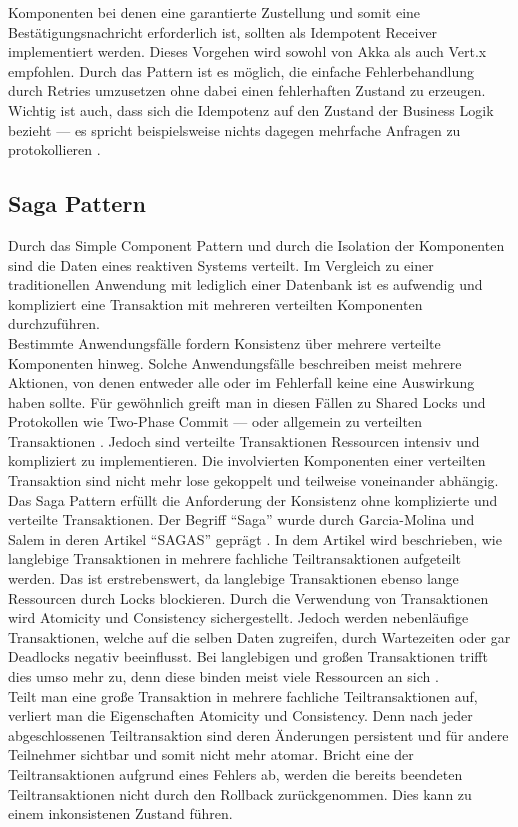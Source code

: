 Komponenten bei denen eine garantierte Zustellung und somit eine Bestätigungsnachricht erforderlich ist, sollten als Idempotent Receiver implementiert werden. Dieses Vorgehen wird sowohl von Akka als auch Vert.x empfohlen. Durch das Pattern ist es möglich, die einfache Fehlerbehandlung durch Retries umzusetzen ohne dabei einen fehlerhaften Zustand zu erzeugen. Wichtig ist auch, dass sich die Idempotenz auf den Zustand der Business Logik bezieht --- es spricht beispielsweise nichts dagegen mehrfache Anfragen zu protokollieren \cite[S.~216]{newman_building_2015}.

\pagebreak

\subsection{Saga Pattern}\label{subsec:saga-pattern}
Durch das Simple Component Pattern und durch die Isolation der Komponenten sind die Daten eines reaktiven Systems verteilt. Im Vergleich zu einer traditionellen Anwendung mit lediglich einer Datenbank ist es aufwendig und kompliziert eine Transaktion mit mehreren verteilten Komponenten durchzuführen.\\
Bestimmte Anwendungsfälle fordern Konsistenz über mehrere verteilte Komponenten hinweg. Solche Anwendungsfälle beschreiben meist mehrere Aktionen, von denen entweder alle oder im Fehlerfall keine eine Auswirkung haben sollte. Für gewöhnlich greift man in diesen Fällen zu Shared Locks und Protokollen wie Two-Phase Commit --- oder allgemein zu verteilten Transaktionen \cite{mccaffrey_goto_2015}. Jedoch sind verteilte Transaktionen Ressourcen intensiv und kompliziert zu implementieren. Die involvierten Komponenten einer verteilten Transaktion sind nicht mehr lose gekoppelt und teilweise voneinander abhängig.\\
Das Saga Pattern erfüllt die Anforderung der Konsistenz ohne komplizierte und verteilte Transaktionen. Der Begriff \enquote{Saga} wurde durch Garcia-Molina und Salem in deren Artikel \enquote{SAGAS} geprägt \cite{garcia-molina_sagas_1987}. In dem Artikel wird beschrieben, wie langlebige Transaktionen in mehrere fachliche Teiltransaktionen aufgeteilt werden. Das ist erstrebenswert, da langlebige Transaktionen ebenso lange Ressourcen durch Locks blockieren. Durch die Verwendung von Transaktionen wird Atomicity und Consistency sichergestellt. Jedoch werden nebenläufige Transaktionen, welche auf die selben Daten zugreifen, durch Wartezeiten oder gar Deadlocks negativ beeinflusst. Bei langlebigen und großen Transaktionen trifft dies umso mehr zu, denn diese binden meist viele Ressourcen an sich \cite[S.~307]{kuhn_reactive_2015}.\\
Teilt man eine große Transaktion in mehrere fachliche Teiltransaktionen auf, verliert man die Eigenschaften Atomicity und Consistency. Denn nach jeder abgeschlossenen Teiltransaktion sind deren Änderungen persistent und für andere Teilnehmer sichtbar und somit nicht mehr atomar. Bricht eine der Teiltransaktionen aufgrund eines Fehlers ab, werden die bereits beendeten Teiltransaktionen nicht durch den Rollback zurückgenommen. Dies kann zu einem inkonsistenen Zustand \mbox{führen}.


